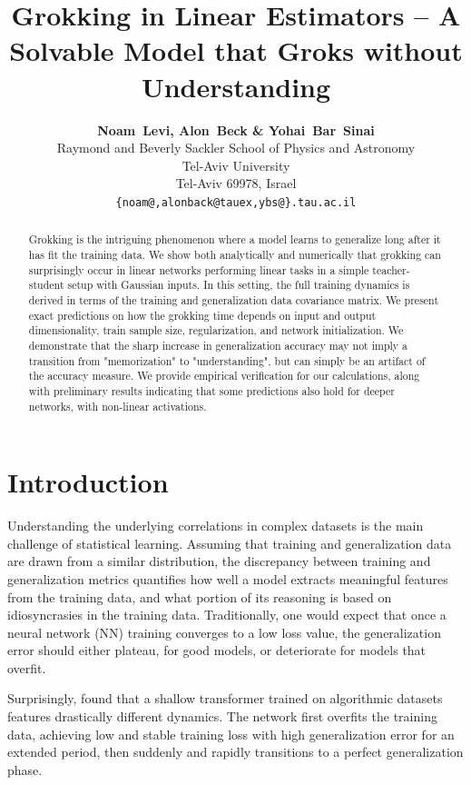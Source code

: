 \documentclass[a4paper,11pt]{article}
\title{\textbf{Grokking in Linear Estimators -- A Solvable Model that Groks without Understanding}}
\author{
\textbf{Noam~Levi, Alon~Beck \& Yohai~Bar~Sinai} \\
Raymond and Beverly Sackler School of Physics and Astronomy\\
Tel-Aviv University\\
Tel-Aviv 69978, Israel \\
\texttt{\{noam@,alonback@tauex,ybs@\}.tau.ac.il} \\
}
\begin{document}
\maketitle

\begin{abstract}
    Grokking is the intriguing phenomenon where a model learns to generalize long after it has fit the training data. 
    We show both analytically and numerically that grokking can surprisingly occur in linear networks performing linear tasks in a simple teacher-student setup with Gaussian inputs. 
    In this setting, the full training dynamics is derived in terms of the training and generalization data covariance matrix. 
    We present exact predictions on how the grokking time depends on input and output dimensionality, train sample size, regularization, and network initialization.
    We demonstrate that the sharp increase in generalization accuracy may not imply a transition from "memorization" to "understanding", but can simply be an artifact of the accuracy measure. We provide empirical verification for our calculations, along with preliminary results indicating that some predictions also hold for deeper networks, with non-linear activations.
 

\end{abstract}
\section{Introduction}

Understanding the underlying correlations in complex datasets is the main challenge of statistical learning. Assuming that training and generalization data are drawn from a similar distribution, the discrepancy between training and generalization metrics quantifies how well a model extracts meaningful features from the training data, and what portion of its reasoning is based on idiosyncrasies in the training data. Traditionally, one would expect that once a neural network (NN) training  converges to a low loss value, the generalization error should either plateau, for good models, or deteriorate for models that overfit.

Surprisingly, \cite{power2022grokking} found that a shallow transformer trained on algorithmic datasets features drastically different dynamics. The network first overfits the training data, achieving low and stable training loss with high generalization error for an extended period, then suddenly and rapidly transitions to a perfect generalization phase.
\end{document}
